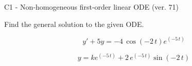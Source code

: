 \begin{exercise}
  \begin{exerciseTitle}C1 - Non-homogeneous first-order linear ODE (ver. 71)\end{exerciseTitle}
  \begin{exerciseStatement}
    
Find the general solution to the given ODE.

    
\[y'+5y= -4 \, \cos\left(-2 \, t\right) e^{\left(-5 \, t\right)}\]

  \end{exerciseStatement}
  \begin{exerciseAnswer}
    
\[y= k e^{\left(-5 \, t\right)} + 2 \, e^{\left(-5 \, t\right)} \sin\left(-2 \, t\right)\]

  \end{exerciseAnswer}
\end{exercise}